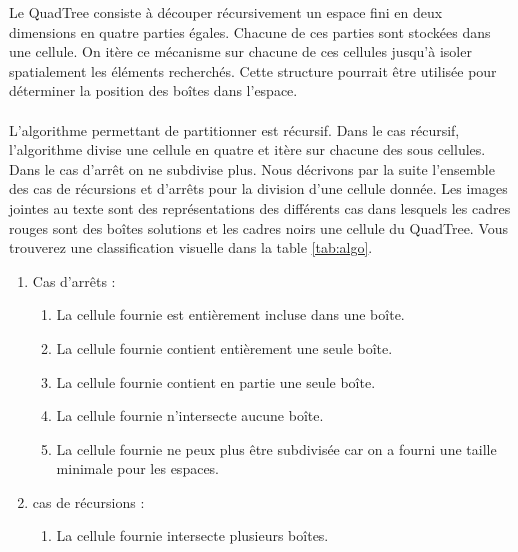 Le QuadTree consiste à découper récursivement un espace fini en deux dimensions en quatre parties égales. Chacune de ces parties sont stockées dans une cellule. On itère ce mécanisme sur chacune de ces cellules jusqu'à isoler spatialement les éléments recherchés.
Cette structure pourrait être utilisée pour déterminer la position des boîtes dans l'espace.

\paragraph{}L'algorithme permettant de partitionner est récursif. Dans le cas récursif, l'algorithme divise une cellule en quatre et itère sur chacune des sous cellules. Dans le cas d'arrêt on ne subdivise plus. Nous décrivons par la suite l'ensemble des cas de récursions et d'arrêts pour la division d'une cellule donnée. Les images jointes au texte sont des représentations des différents cas dans lesquels les cadres rouges sont des boîtes solutions et les cadres noirs une cellule du QuadTree. Vous trouverez une classification visuelle dans la table \ref{tab:algo}.
\begin{enumerate}
\item Cas d'arrêts : 
\begin{enumerate}
\item La cellule fournie est entièrement incluse dans une boîte.
\label{enu:quad1}
\item La cellule fournie contient entièrement une seule boîte.
\label{enu:quad2}
\item La cellule fournie contient en partie une seule boîte.
\label{enu:quad3}
\item La cellule fournie n'intersecte aucune boîte.
\label{enu:quad4}
\item La cellule fournie ne peux plus être subdivisée car on a fourni une taille minimale pour les espaces.
\end{enumerate}
\item cas de récursions :
\begin{enumerate}
\item La cellule fournie intersecte plusieurs boîtes.
\label{enu:quad5}
\end{enumerate}
\end{enumerate}

